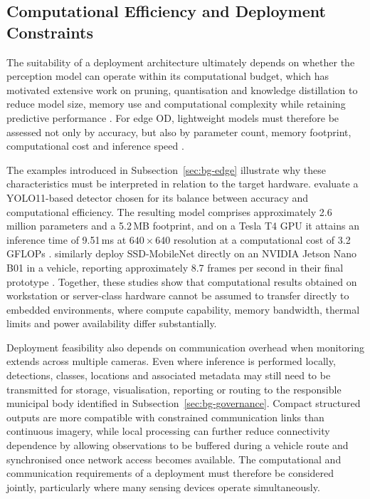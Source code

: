 \subsection{Computational Efficiency and Deployment Constraints}
\label{sec:bg-computational-efficiency}
The suitability of a deployment architecture ultimately depends on whether the perception model can operate within its computational budget, which has motivated extensive work on pruning, quantisation and knowledge distillation to reduce model size, memory use and computational complexity while retaining predictive performance \cite{mittal2024lightweightedge}. For edge \gls{OD}, lightweight models must therefore be assessed not only by accuracy, but also by parameter count, memory footprint, computational cost and inference speed \cite{mittal2024lightweightedge}.

The examples introduced in Subsection~\ref{sec:bg-edge} illustrate why these characteristics must be interpreted in relation to the target hardware. \citeauthor{rai2026ewyolo} evaluate a \gls{YOLO}11-based detector chosen for its balance between accuracy and computational efficiency. The resulting model comprises approximately 2.6 million parameters and a 5.2\,\gls{MB} footprint, and on a Tesla T4 \gls{GPU} it attains an inference time of 9.51\,ms at \(640 \times 640\) resolution at a computational cost of 3.2\,\gls{GFLOPs} \cite{rai2026ewyolo}. \citeauthor{sarvajcz2024aiontheroad} similarly deploy SSD-MobileNet directly on an NVIDIA Jetson Nano B01 in a vehicle, reporting approximately 8.7 frames per second in their final prototype \cite{sarvajcz2024aiontheroad}. Together, these studies show that computational results obtained on workstation or server-class hardware cannot be assumed to transfer directly to embedded environments, where compute capability, memory bandwidth, thermal limits and power availability differ substantially.

Deployment feasibility also depends on communication overhead when monitoring extends across multiple cameras. Even where inference is performed locally, detections, classes, locations and associated metadata may still need to be transmitted for storage, visualisation, reporting or routing to the responsible municipal body identified in Subsection~\ref{sec:bg-governance}. Compact structured outputs are more compatible with constrained communication links than continuous imagery, while local processing can further reduce connectivity dependence by allowing observations to be buffered during a vehicle route and synchronised once network access becomes available. The computational and communication requirements of a deployment must therefore be considered jointly, particularly where many sensing devices operate simultaneously.

